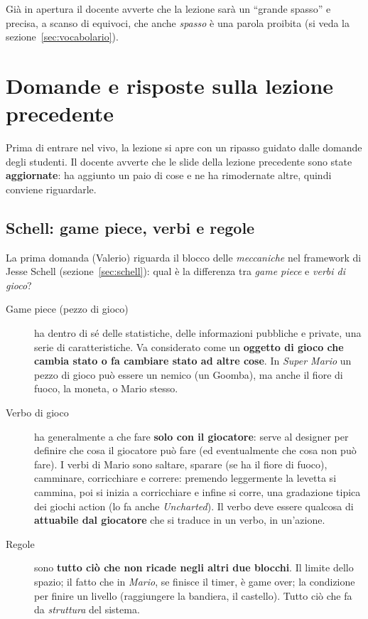 Già in apertura il docente avverte che la lezione sarà un ``grande spasso''
e precisa, a scanso di equivoci, che anche \emph{spasso} è una parola
proibita (si veda la sezione~\ref{sec:vocabolario}).

\section{Domande e risposte sulla lezione precedente}
\label{sec:qa-gd2}

Prima di entrare nel vivo, la lezione si apre con un ripasso guidato dalle
domande degli studenti. Il docente avverte che le slide della lezione
precedente sono state \textbf{aggiornate}: ha aggiunto un paio di cose e ne ha
rimodernate altre, quindi conviene riguardarle.

\subsection{Schell: game piece, verbi e regole}

La prima domanda (Valerio) riguarda il blocco delle \emph{meccaniche} nel
framework di Jesse Schell (sezione~\ref{sec:schell}): qual è la differenza
tra \emph{game piece} e \emph{verbi di gioco}?

\begin{description}
  \item[Game piece (pezzo di gioco)] ha dentro di sé delle statistiche,
        delle informazioni pubbliche e private, una serie di caratteristiche.
        Va considerato come un \textbf{oggetto di gioco che cambia stato o fa
        cambiare stato ad altre cose}. In \emph{Super Mario} un pezzo di gioco
        può essere un nemico (un Goomba), ma anche il fiore di fuoco, la
        moneta, o Mario stesso.
  \item[Verbo di gioco] ha generalmente a che fare \textbf{solo con il
        giocatore}: serve al designer per definire che cosa il giocatore può
        fare (ed eventualmente che cosa non può fare). I verbi di Mario sono
        saltare, sparare (se ha il fiore di fuoco), camminare, corricchiare e
        correre: premendo leggermente la levetta si cammina, poi si inizia a
        corricchiare e infine si corre, una gradazione tipica dei giochi
        action (lo fa anche \emph{Uncharted}). Il verbo deve essere qualcosa
        di \textbf{attuabile dal giocatore} che si traduce in un verbo, in
        un'azione.
  \item[Regole] sono \textbf{tutto ciò che non ricade negli altri due
        blocchi}. Il limite dello spazio; il fatto che in \emph{Mario}, se
        finisce il timer, è game over; la condizione per finire un livello
        (raggiungere la bandiera, il castello). Tutto ciò che fa da
        \emph{struttura} del sistema.
\end{description}

